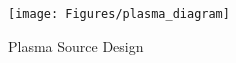\documentclass[11pt, oneside]{article}   	%
\newcommand{\todo}[1]{ \textcolor{red}{\bf{To Do:} #1}}
\begin{document}

\begin{figure}
\centering
\texttt{[image: Figures/plasma\_diagram]}
\caption{Plasma Source Design}
\label{fig:plasma_diagram}
\end{figure}
\end{document}
